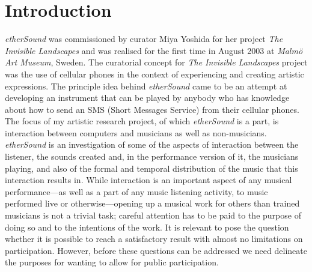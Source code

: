 \section{Introduction} 
\emph{etherSound} was commissioned by curator Miya Yoshida for her project \emph{The Invisible Landscapes} and was realised for the first time in August 2003 at \emph{Malm\"{o} Art Museum}, Sweden. The curatorial concept for \emph{The Invisible Landscapes}  project was the use of cellular phones in the context of experiencing and creating artistic expressions. The principle idea behind \emph{etherSound} came to be an attempt at developing an instrument that can be played by anybody who has knowledge about how to send an SMS (Short Messages Service) from their cellular phones. The focus of my artistic research project, of which \emph{etherSound} is a part, is interaction between computers and musicians as well as non-musicians. \emph{etherSound} is an investigation of some of the aspects of interaction between the listener, the sounds created and, in the performance version of it, the musicians playing, and also of the formal and temporal distribution of the music that this interaction results in. 
While interaction is an important aspect of any musical performance---as well as a part of any music listening activity, to music performed live or otherwise---opening up a musical work for others than trained musicians is not a trivial task; careful attention has to be paid to the purpose of doing so and to the intentions of the work. It is relevant to pose the question whether it is possible to reach a satisfactory result with almost no limitations on participation. 
However, before these questions can be addressed we need delineate the purposes for wanting to allow for public participation. 


